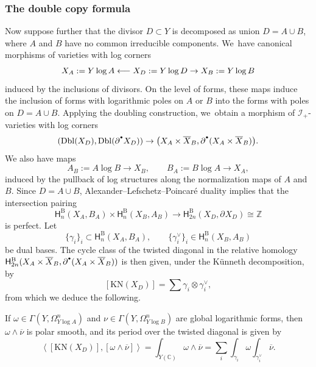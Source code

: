 \documentclass[10pt]{amsart}
\let\oldbullet\bullet
\renewcommand{\bullet}{{\raisebox{1pt}{$\scriptscriptstyle\oldbullet$}}}
\newcommand\from{\mathchoice{\longleftarrow}{\leftarrow}{\leftarrow}{\leftarrow}}
\newcommand{\rbirac}[1]{\bigl(#1\bigr)}
\theoremstyle{definition}
\theoremstyle{remark}
\newcommand{\CC}{\mathbb{C}}
\newcommand{\ZZ}{\mathbb{Z}}
\newcommand{\abrac}[1]{\left\langle#1\right\rangle}
\newcommand{\bdX}[1][]{\partial^{#1} X}
\newcommand{\cX}{\overline{X}}
\newcommand{\KN}[1]{\mathrm{KN}(#1)}
\newcommand{\Dbl}[1]{\mathrm{Dbl}(#1)}
\newcommand{\sect}[1]{\mathsf{\Gamma}(#1)}
\newcommand{\HlgyB}[2][\bullet]{\mathsf{H}^{\mathrm{B}}_{#1}(#2)}
\newcommand{\forms}[2][\bullet]{\Omega^{#1}_{#2}}
\newcommand{\ascat}{\mathscr{I}_+}
\begin{document}
\subsubsection{The double copy formula}
Now suppose further that the divisor $D \subset Y$ is decomposed as union $D = A \cup B$, where $A$ and $B$ have no common irreducible components. We~have canonical morphisms of varieties with log corners\vspace*{-3pt}
\[
X_A := Y \log A \from X_D := Y \log D \to X_B := Y \log B
\]
induced by the inclusions of divisors. On the level of forms, these maps induce the inclusion of forms with logarithmic poles on $A$ or $B$ into the forms with poles on $D = A \cup B$. Applying the doubling construction, we~obtain a morphism of $\ascat$-varieties with log corners\vspace*{-3pt}
\begin{equation}
(\Dbl{X_D},\Dbl{\bdX[\bullet]_D}) \to \rbirac{X_A\times \cX_B, \partial^\bullet(X_A \times \cX_B)}.
\label{eq:double-copy-pairs}
\end{equation}
We also have maps\vspace*{-3pt}
\[
A_B := A \log B \to X_B, \qquad B_A := B \log A \to X_A,
\]
induced by the pullback of log structures along the normalization maps of $A$ and $B$. Since $D = A \cup B$, Alexander--Lefschetz--Poincaré duality implies that the intersection pairing\vspace*{-3pt}
\[
\HlgyB[n]{X_A,B_A} \times \HlgyB[n]{X_B,A_B} \to \HlgyB[2n]{X_D,\bdX_D} \cong \ZZ
\]
is perfect. Let\vspace*{-3pt}
\[
\{\gamma_i\}_i \subset \HlgyB[n]{X_A,B_A}, \qquad
\{\gamma_i^\vee\}_i \in \HlgyB[n]{X_B,A_B}
\]
be dual bases. The cycle class of the twisted diagonal in the relative homology $\HlgyB[2n]{X_A\times\cX_B,\partial^\bullet(X_A\times\cX_B)}$ is then given, under the Künneth decomposition, by\vspace*{-3pt}
\[
[\KN{X_D}] = \sum \gamma_i \otimes \gamma_i^\vee,
\]
from which we deduce the following.
\begin{proposition}
If $\omega \in \sect{Y,\forms[n]{Y \log A}}$ and $\nu \in \sect{Y,\forms[n]{Y \log B}}$ are global logarithmic forms, then $\omega \wedge \overline{\nu}$ is polar smooth, and its period over the twisted diagonal is given by\vspace*{-3pt}
\[
\abrac{[\KN{X_D}],[\omega\wedge\overline{\nu}]} = \int_{Y(\CC)}\omega \wedge \overline{\nu} = \sum_i \int_{\gamma_i}\omega \int_{\gamma_i^\vee} \overline{\nu}.
\]
\end{proposition}
\end{document}
